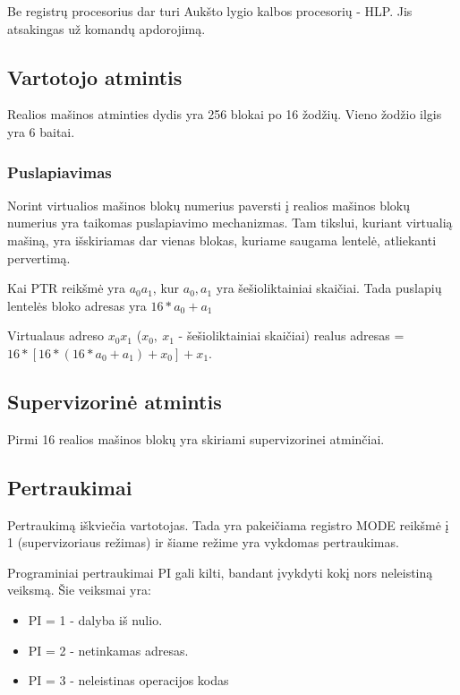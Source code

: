 \documentclass{VUMIFInfKursinis}
\begin{document}
Be registrų procesorius dar turi Aukšto lygio kalbos procesorių - HLP. Jis atsakingas už komandų apdorojimą.

\subsection{Vartotojo atmintis}

Realios mašinos atminties dydis yra 256 blokai po 16 žodžių. Vieno žodžio ilgis yra 6 baitai.

\subsubsection{Puslapiavimas}

Norint virtualios mašinos blokų numerius paversti į realios mašinos blokų numerius yra taikomas puslapiavimo mechanizmas. Tam tikslui, kuriant virtualią mašiną, yra išskiriamas dar vienas blokas, kuriame saugama lentelė, atliekanti pervertimą.

Kai PTR reikšmė yra $a_0a_1$, kur $a_0, a_1$ yra šešioliktainiai skaičiai. Tada puslapių lentelės bloko adresas yra $16 * a_0 + a_1$  

Virtualaus adreso $x_0x_1$ ($x_0, \ x_1$ - šešioliktainiai skaičiai) realus adresas = $16 * [16*(16 * a_0 + a_1) + x_0] + x_1$.

\subsection{Supervizorinė atmintis}

Pirmi 16 realios mašinos blokų yra skiriami supervizorinei atminčiai.

\subsection{Pertraukimai}

Pertraukimą iškviečia vartotojas. Tada yra pakeičiama registro MODE reikšmė į 1 (supervizoriaus režimas) ir šiame režime yra vykdomas pertraukimas. 

Programiniai pertraukimai PI gali kilti, bandant įvykdyti kokį nors neleistiną veiksmą. Šie veiksmai yra:

\begin{itemize}
	\item PI = 1 - dalyba iš nulio.
	\item PI = 2 - netinkamas adresas.
	\item PI = 3 - neleistinas operacijos kodas
\end{itemize}
\end{document}
